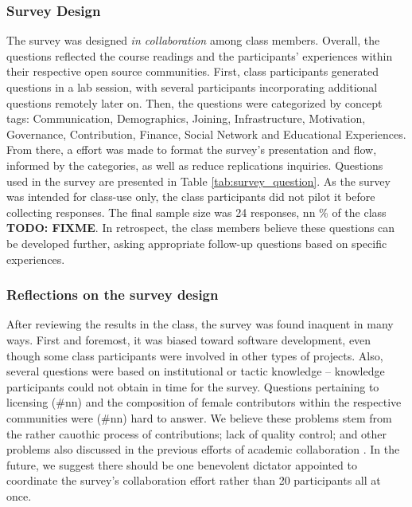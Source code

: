 \subsubsection{Survey Design}

The survey was designed {\it in collaboration} among class members. Overall, the questions reflected the course 
readings and the participants' experiences within their respective open source communities. First, class 
participants generated questions in a lab session, with several participants incorporating additional questions remotely later on. 
Then, the questions were categorized by concept tags: Communication, Demographics, Joining, Infrastructure, Motivation,
Governance, Contribution, Finance, Social Network and Educational Experiences. From there, a effort was made to format the survey's 
presentation and flow, informed by the categories, as well as reduce replications inquiries. Questions used in the survey 
are presented in Table \ref{tab:survey_question}. As the survey was intended for class-use only, the class participants did not pilot it before collecting 
responses. The final sample size was 24 responses, nn \% of the class \textbf{TODO: FIXME}. In retrospect, the class members believe these questions can be 
developed further, asking appropriate follow-up questions based on specific experiences.

\subsubsection{Reflections on the survey design}

After reviewing the results in the class, the survey was found inaquent in many ways. First and foremost, it was biased 
toward software development, even though some class participants were involved in other types of projects. Also, several questions were based 
on institutional or tactic knowledge -- knowledge participants could not obtain in time for the survey. Questions pertaining to licensing (\#nn) and the composition 
of female contributors within the respective communities were (\#nn) hard to answer. We believe these problems stem from the rather cauothic process of contributions; 
lack of quality control; and other problems also discussed in the previous efforts of academic collaboration \cite{Tomlinson2012}. In the future, we suggest there should be 
one benevolent dictator appointed to coordinate the survey's collaboration effort rather than 20 participants all at once. 


